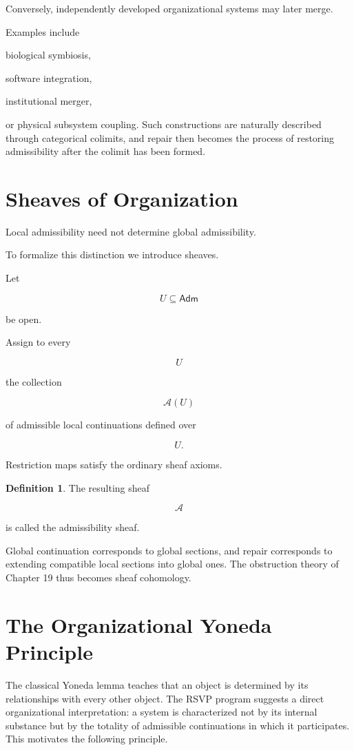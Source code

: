 \documentclass[11pt,oneside]{book}
\numberwithin{equation}{chapter}
\theoremstyle{definition}
\newtheorem{definition}{Definition}[chapter]
\theoremstyle{plain}
\newcommand{\Adm}{\mathsf{Adm}}
\begin{document}
Conversely, independently developed organizational systems may later merge.

Examples include

biological symbiosis,

software integration,

institutional merger,

or physical subsystem coupling. Such constructions are naturally described through categorical colimits, and repair then becomes the process of restoring admissibility after the colimit has been formed.

\section{Sheaves of Organization}

Local admissibility need not determine global admissibility.

To formalize this distinction we introduce sheaves.

Let

\[
U
\subseteq
\Adm
\]

be open.

Assign to every

\[
U
\]

the collection

\[
\mathscr A(U)
\]

of admissible local continuations defined over

\[
U.
\]

Restriction maps satisfy the ordinary sheaf axioms.

\begin{definition}

The resulting sheaf

\[
\mathscr A
\]

is called the admissibility sheaf.

\end{definition}

Global continuation corresponds to global sections, and repair corresponds to extending compatible local sections into global ones. The obstruction theory of Chapter 19 thus becomes sheaf cohomology.

\section{The Organizational Yoneda Principle}

The classical Yoneda lemma teaches that an object is determined by its relationships with every other object. The RSVP program suggests a direct organizational interpretation: a system is characterized not by its internal substance but by the totality of admissible continuations in which it participates. This motivates the following principle.
\end{document}

